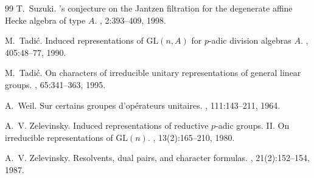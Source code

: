 \documentclass[10pt,a4paper]{article}
\theoremstyle{definition}
\theoremstyle{remark}
\numberwithin{equation}{section}
\begin{document}
\begin{thebibliography}{99}
T.~Suzuki.
's conjecture on the {Jantzen} filtration for the
  degenerate affine {Hecke} algebra of type {$A$}.
, 2:393--409, 1998.

M.~Tadi{\'c}.
\newblock Induced representations of {$\mathrm{GL}(n,A)$} for {$p$}-adic
  division algebras {$A$}.
, 405:48--77, 1990.

M.~Tadi{\'c}.
\newblock On characters of irreducible unitary representations of general
  linear groups.
, 65:341--363, 1995.

A.~Weil.
\newblock Sur certains groupes d'op{\'e}rateurs unitaires.
, 111:143--211, 1964.

A.~V. Zelevinsky.
\newblock Induced representations of reductive {$p$}-adic groups. {II}. {On}
  irreducible representations of {$\mathrm{GL}(n)$}.
, 13(2):165--210, 1980.

A.~V. Zelevinsky.
\newblock Resolvents, dual pairs, and character formulas.
, 21(2):152--154, 1987.

\end{thebibliography}
\end{document}
